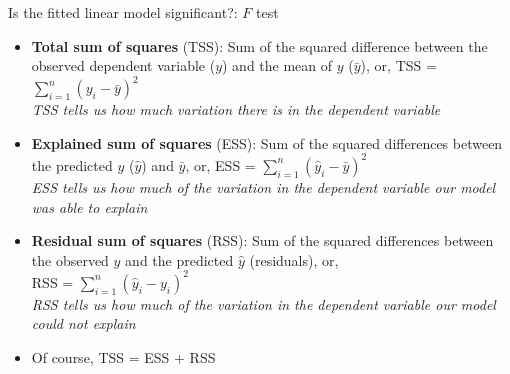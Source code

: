 \documentclass[xcolor=x11names,compress]{beamer}
\renewcommand{\(}{\begin{columns}}
\renewcommand{\)}{\end{columns}}
\newcommand{\<}[1]{\begin{column}{#1}}
\renewcommand{\>}{\end{column}}
\begin{document}
\begin{frame}{Is the fitted linear model significant?: $F$ test}

\begin{itemize}[<+->]\itemsep6pt

\item {\bf Total sum of squares} (TSS): Sum of the squared difference between the observed dependent variable ($y$) and the mean of $y$ ($\bar{y}$), or,		
 TSS = $\sum_{i=1}^{n}(y_i - \bar{y})^2$\\
{\it TSS tells us how much variation there is in the dependent variable}

\item {\bf Explained sum of squares} (ESS): Sum of the squared 
differences between the predicted $y$ ($\hat{y}$) and $\bar{y}$, or,
ESS = $\sum_{i=1}^{n} (\hat{y}_i - \bar{y})^2$\\

{\it ESS tells us how much of the variation in the dependent variable 
our model was able to explain}

\item {\bf Residual sum of squares} (RSS): Sum of the squared 
differences between the observed $y$ and the predicted $\hat{y}$ (residuals), or, \\

RSS = $\sum_{i=1}^{n} (\hat{y}_i - y_i)^2$\\

{\it RSS tells us how much of the variation in the dependent variable 
our model could not explain}

\item Of course, TSS = ESS + RSS

\end{itemize}

\end{frame}
\end{document}
